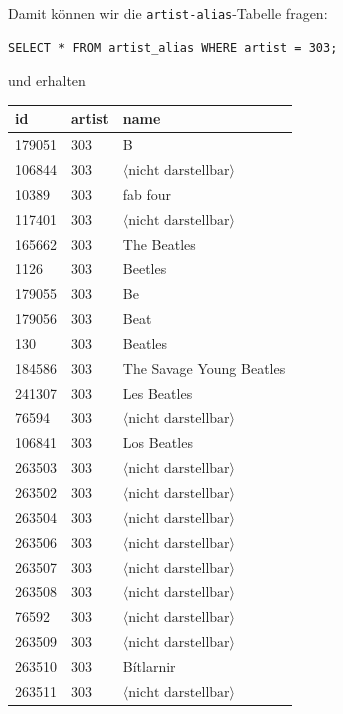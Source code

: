 \documentclass{article}
\begin{document}
	Damit können wir die \texttt{artist-alias}-Tabelle fragen:
	\begin{lstlisting}[style=sql]
SELECT * FROM artist_alias WHERE artist = 303;
	\end{lstlisting}
	und erhalten
	\begin{center}
		\begin{longtable}{l|l|l}
			\textbf{id} & \textbf{artist} & \textbf{name} \\ \hline
			179051 & 303 & B \\ \hline
			106844 & 303 & $\langle\text{nicht darstellbar}\rangle$ \\ \hline
			10389 & 303 & fab four \\ \hline
			117401 & 303 & $\langle\text{nicht darstellbar}\rangle$ \\ \hline
			165662 & 303 & The Beatles \\ \hline
			1126 & 303 & Beetles \\ \hline
			179055 & 303 & Be \\ \hline
			179056 & 303 & Beat \\ \hline
			130 & 303 & Beatles \\ \hline
			184586 & 303 & The Savage Young Beatles \\ \hline
			241307 & 303 & Les Beatles \\ \hline
			76594 & 303 & $\langle\text{nicht darstellbar}\rangle$ \\ \hline
			106841 & 303 & Los Beatles \\ \hline
			263503 & 303 & $\langle\text{nicht darstellbar}\rangle$ \\ \hline
			263502 & 303 & $\langle\text{nicht darstellbar}\rangle$ \\ \hline
			263504 & 303 & $\langle\text{nicht darstellbar}\rangle$ \\ \hline
			263506 & 303 & $\langle\text{nicht darstellbar}\rangle$ \\ \hline
			263507 & 303 & $\langle\text{nicht darstellbar}\rangle$ \\ \hline
			263508 & 303 & $\langle\text{nicht darstellbar}\rangle$ \\ \hline
			76592 & 303 & $\langle\text{nicht darstellbar}\rangle$ \\ \hline
			263509 & 303 & $\langle\text{nicht darstellbar}\rangle$ \\ \hline
			263510 & 303 & Bítlarnir \\ \hline
			263511 & 303 & $\langle\text{nicht darstellbar}\rangle$ \\ \hline

\end{longtable}
\end{center}
\end{document}
